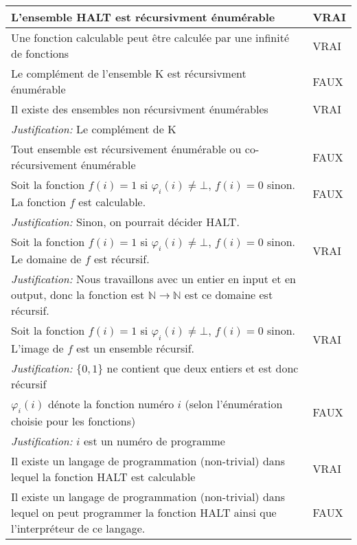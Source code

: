 \begin{longtable}{p{13cm}|l}
    L'ensemble HALT est récursivment énumérable & VRAI \\
    \hline
    Une fonction calculable peut être calculée par une infinité de fonctions & VRAI \\
    \hline
    Le complément de l'ensemble K est récursivment énumérable & FAUX \\
    \hline
    Il existe des ensembles non récursivment énumérables & VRAI \\
    \textit{Justification:} Le complément de K & \\
    \hline
    Tout ensemble est récursivement énumérable ou co-récursivement énumérable & FAUX \\
    \hline
    Soit la fonction $f(i) = 1$ si $\varphi_{i}(i) \neq \bot$, $f(i) = 0$ sinon. La fonction $f$ est calculable. & FAUX \\
    \textit{Justification:} Sinon, on pourrait décider HALT. & \\
    \hline
    Soit la fonction $f(i) = 1$ si $\varphi_{i}(i) \neq \bot$, $f(i) = 0$ sinon. Le domaine de $f$ est récursif. & VRAI \\
    \textit{Justification:} Nous travaillons avec un entier en input et en output, donc la fonction est $\mathbb{N} \rightarrow \mathbb{N}$ est ce domaine est récursif. & \\
    \hline
    Soit la fonction $f(i) = 1$ si $\varphi_{i}(i) \neq \bot$, $f(i) = 0$ sinon. L'image de $f$ est un ensemble récursif. & VRAI \\
    \textit{Justification:} $\{0,1\}$ ne contient que deux entiers et est donc récursif &  \\
    \hline
    $\varphi_{i}(i)$ dénote la fonction numéro $i$ (selon l'énumération choisie pour les fonctions) & FAUX \\
    \textit{Justification:} $i$ est un numéro de programme & \\
    \hline
    Il existe un langage de programmation (non-trivial) dans lequel la fonction HALT est calculable & VRAI \\
    \hline
    Il existe un langage de programmation (non-trivial) dans lequel on peut programmer la fonction HALT ainsi que l'interpréteur de ce langage. & FAUX \\

\end{longtable}
